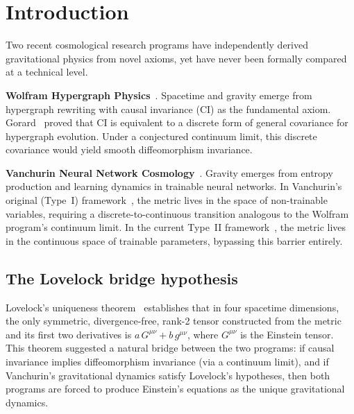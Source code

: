 \documentclass[11pt]{article}
\theoremstyle{definition}
\theoremstyle{remark}
\begin{document}
\section{Introduction}
\label{sec:introduction}

Two recent cosmological research programs have independently
derived gravitational physics from novel axioms, yet have never been
formally compared at a technical level.

\textbf{Wolfram Hypergraph Physics}~\cite{Wolfram2020,Gorard2020}.
Spacetime and gravity emerge from hypergraph rewriting with causal
invariance (CI) as the fundamental axiom.
Gorard~\cite{Gorard2020} proved that CI is equivalent to a discrete
form of general covariance for hypergraph evolution.
Under a conjectured continuum limit, this discrete covariance would
yield smooth diffeomorphism invariance.

\textbf{Vanchurin Neural Network Cosmology}~\cite{Vanchurin2020,Vanchurin2025,Vanchurin2025CGD,Vanchurin2024EFT}.
Gravity emerges from entropy production and learning dynamics in trainable
neural networks.
In Vanchurin's original (Type~I) framework~\cite{Vanchurin2020}, the metric
lives in the space of non-trainable variables, requiring a discrete-to-continuous
transition analogous to the Wolfram program's continuum limit.
In the current Type~II framework~\cite{Vanchurin2025,Vanchurin2025CGD},
the metric lives in the continuous space of trainable parameters, bypassing
this barrier entirely.

\subsection{The Lovelock bridge hypothesis}
\label{sec:bridge-hypothesis}

Lovelock's uniqueness theorem~\cite{Lovelock1971} establishes that in four
spacetime dimensions, the only symmetric, divergence-free, rank-2 tensor
constructed from the metric and its first two derivatives is
$a\,G^{\mu\nu} + b\,g^{\mu\nu}$, where $G^{\mu\nu}$ is the Einstein
tensor.
This theorem suggested a natural bridge between the two programs: if
causal invariance implies diffeomorphism invariance (via a continuum
limit), and if Vanchurin's gravitational dynamics satisfy Lovelock's
hypotheses, then both programs are forced to produce Einstein's equations
as the unique gravitational dynamics.
\end{document}
